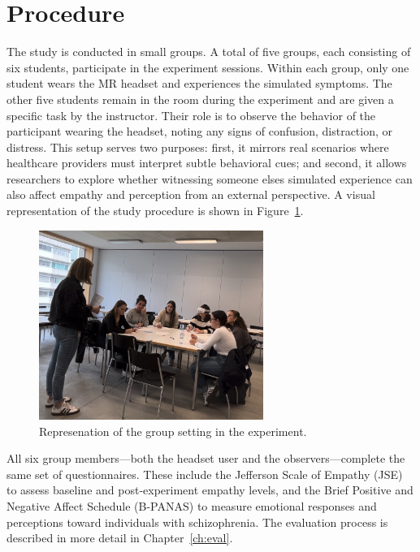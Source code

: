 \section{Procedure}

The study is conducted in small groups. A total of five groups, each consisting of six students, participate in the experiment sessions. Within each group, only one student wears the MR headset and experiences the simulated symptoms. The other five students remain in the room during the experiment and are given a specific task by the instructor. Their role is to observe the behavior of the participant wearing the headset, noting any signs of confusion, distraction, or distress. This setup serves two purposes: first, it mirrors real scenarios where healthcare providers must interpret subtle behavioral cues; and second, it allows researchers to explore whether witnessing someone elses simulated experience can also affect empathy and perception from an external perspective. A visual representation of the study procedure is shown in Figure~\ref{fig:group-setting}.

\begin{figure}[htbp]
    \centering
    \includegraphics[width=0.65\textwidth]{../../Figures/Group-setting-02.jpg}
    \caption{Represenation of the group setting in the experiment.}
    \label{fig:group-setting}
\end{figure}

\vspace{1em}

All six group members—both the headset user and the observers—complete the same set of questionnaires. These include the Jefferson Scale of Empathy (JSE) \cite{Hojat2002} to assess baseline and post-experiment empathy levels, and the Brief Positive and Negative Affect Schedule (B-PANAS) \cite{Boiroux2024} to measure emotional responses and perceptions toward individuals with schizophrenia. The evaluation process is described in more detail in Chapter~\ref{ch:eval}.

